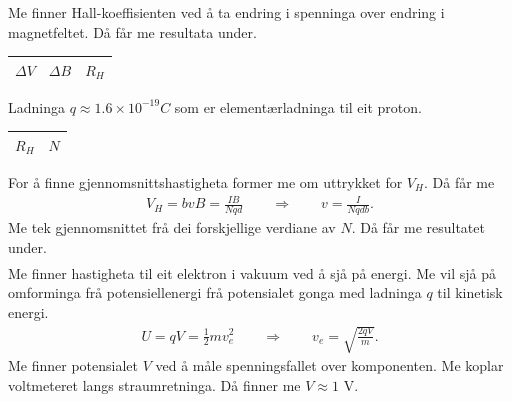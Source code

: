 \documentclass[11pt, a4paper]{article}
\begin{document}
    Me finner Hall-koeffisienten ved å ta endring i spenninga over endring i magnetfeltet. Då får me resultata under.
    \begin{center}
      \begin{tabular}{|l|l||l|}
        \hline
        $\Delta V$ & $\Delta B$ & $R_{H}$ \\
        \hline
        
        \hline
      \end{tabular}
    \end{center}

    Ladninga $q \approx 1.6\times10^{-19}C$ som er elementærladninga til eit proton.
    \begin{center}
      \begin{tabular}{|l||l|}
        \hline
        $R_{H}$ & $N$ \\
        \hline
        
        \hline
      \end{tabular}
    \end{center}

    For å finne gjennomsnittshastigheta former me om uttrykket for $V_{H}$. Då får me
    \begin{align*}
      V_{H} = bvB = \frac{IB}{Nqd} \qquad \Rightarrow \qquad v = \frac{I}{Nqdb}.
    \end{align*}
    Me tek gjennomsnittet frå dei forskjellige verdiane av $N$. Då får me resultatet under.
    \begin{align*}
      
    \end{align*}
    Me finner hastigheta til eit elektron i vakuum ved å sjå på energi. Me vil sjå på omforminga frå potensiellenergi frå potensialet gonga med ladninga $q$ til kinetisk energi.
    \begin{align*}
      U = qV = \frac{1}{2}mv_e^2 \qquad \Rightarrow \qquad v_e = \sqrt{\frac{2qV}{m}}.
    \end{align*}
    Me finner potensialet $V$ ved å måle spenningsfallet over komponenten. Me koplar voltmeteret langs straumretninga. Då finner me $V \approx 1$ V.
    \begin{align*}
      
    \end{align*}
\end{document}
